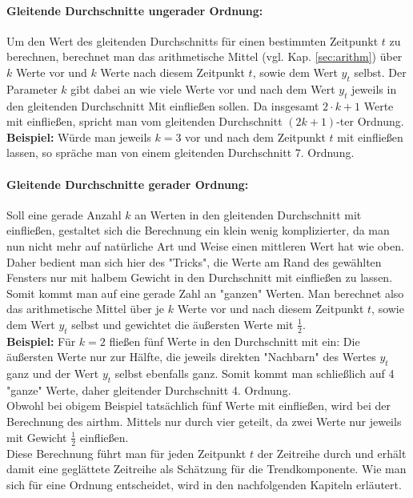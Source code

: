 \documentclass[a4paper]{article}
\newcommand\dangersign{%
 \makebox[1.8em][c]{%
 \makebox[0pt][c]{\raisebox{.15em}{\small!}}%
 \makebox[0pt][c]{\color{red}\Large$\triangle$}}}%
\begin{document}
\paragraph{Gleitende Durchschnitte ungerader Ordnung:} Um den Wert des gleitenden Durchschnitts für einen bestimmten Zeitpunkt $t$ zu berechnen, berechnet man das arithmetische Mittel (vgl. Kap. \ref{sec:arithm}) über $k$ Werte vor und $k$ Werte nach diesem Zeitpunkt $t$, sowie dem Wert $y_t$ selbst. Der Parameter $k$ gibt dabei an wie viele Werte vor und nach dem Wert $y_t$ jeweils in den gleitenden Durchschnitt Mit einfließen sollen. Da insgesamt $2 \cdot k + 1$ Werte mit einfließen, spricht man vom gleitenden Durchschnitt $(2k + 1)$-ter Ordnung.\\
\textbf{Beispiel:} Würde man jeweils $k = 3$ vor und nach dem Zeitpunkt $t$ mit einfließen lassen, so spräche man von einem gleitenden Durchschnitt 7. Ordnung. 

\paragraph{Gleitende Durchschnitte gerader Ordnung:} Soll eine gerade Anzahl $k$ an Werten in den gleitenden Durchschnitt mit einfließen, gestaltet sich die Berechnung ein klein wenig komplizierter, da man nun nicht mehr auf natürliche Art und Weise einen mittleren Wert hat wie oben. Daher bedient man sich hier des "Tricks", die Werte am Rand des gewählten Fensters nur mit halbem Gewicht in den Durchschnitt mit einfließen zu lassen. Somit kommt man auf eine gerade Zahl an "ganzen" Werten. Man berechnet also das arithmetische Mittel über je $k$ Werte vor und nach diesem Zeitpunkt $t$, sowie dem Wert $y_t$ selbst und gewichtet die äußersten Werte mit $\frac{1}{2}$.\\
\textbf{Beispiel:} Für $k = 2$ fließen fünf Werte in den Durchschnitt mit ein: Die äußersten Werte nur zur Hälfte, die jeweils direkten "Nachbarn" des Wertes $y_t$ ganz und der Wert $y_t$ selbst ebenfalls ganz. Somit kommt man schließlich auf 4 "ganze" Werte, daher gleitender Durchschnitt 4. Ordnung.\\

\noindent \dangersign Obwohl bei obigem Beispiel tatsächlich fünf Werte mit einfließen, wird bei der Berechnung des airthm. Mittels nur durch vier geteilt, da zwei Werte nur jeweils mit Gewicht $\frac{1}{2}$ einfließen.\\

\noindent Diese Berechnung führt man  für jeden Zeitpunkt $t$ der Zeitreihe durch und erhält damit eine geglättete Zeitreihe als Schätzung für die Trendkomponente. Wie man sich für eine Ordnung entscheidet, wird in den nachfolgenden Kapiteln erläutert.\\
\end{document}
